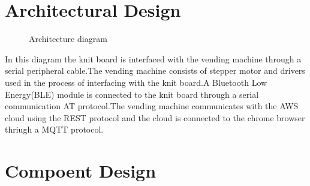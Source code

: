 \documentclass[oneside,a4paper,12pt]{report}
\begin{document}
\section{Architectural Design}  
  \begin{center}
	\begin{figure}[!htbp]
		\centering
	  \caption{Architecture diagram}
	  \label{fig:arch-dig}
	\end{figure}
\end{center} 
\newpage
In this diagram the knit board is interfaced with the vending machine through a serial peripheral cable.The vending machine consists of stepper motor and drivers used in the process of interfacing with the knit board.A Bluetooth Low Energy(BLE) module is connected to the knit board through a serial communication AT protocol.The vending machine communicates with the AWS cloud using the REST protocol and the cloud is connected to the chrome browser thriugh a MQTT protocol.
\section{Compoent Design} 
\end{document}
